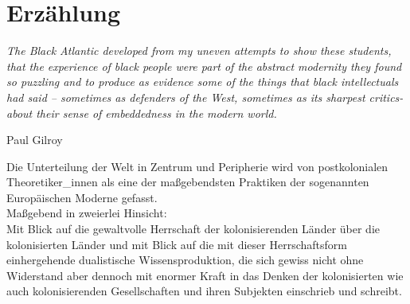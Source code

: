 \section{Erzählung}
\epigraph{
\textit{The Black Atlantic developed from my uneven attempts to show these students, that the experience of black people were part of the abstract modernity they found so puzzling and to produce as evidence some of the things that black intellectuals had said – sometimes as defenders of the West, sometimes as its sharpest critics- about their sense of embeddedness in the modern world.}
}{Paul Gilroy\footnotemark} 

Die Unterteilung der Welt in Zentrum und Peripherie wird von postkolonialen
Theoretiker\_innen als eine der maßgebendsten Praktiken der sogenannten
Europäischen Moderne gefasst. \\
Maßgebend in zweierlei Hinsicht:\\
Mit Blick auf
die gewaltvolle Herrschaft der kolonisierenden Länder über die kolonisierten
Länder und mit Blick auf die mit dieser Herrschaftsform einhergehende
dualistische Wissensproduktion, die sich gewiss nicht ohne
Widerstand\footnotemark {} aber
dennoch mit enormer Kraft in das Denken der kolonisierten wie auch
kolonisierenden Gesellschaften und ihren Subjekten einschrieb und
schreibt.\footnotemark {}\\

